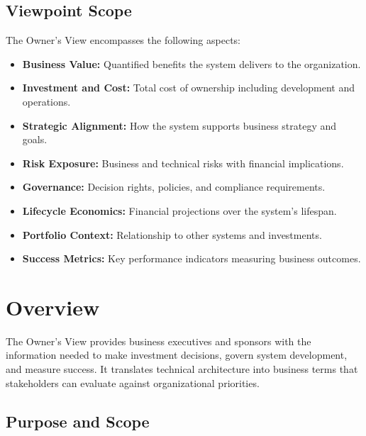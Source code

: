 \documentclass[11pt,letterpaper]{article}
\begin{document}
\subsection{Viewpoint Scope}

The Owner's View encompasses the following aspects:

\begin{itemize}
    \item \textbf{Business Value:} Quantified benefits the system delivers to the organization.
    
    \item \textbf{Investment and Cost:} Total cost of ownership including development and operations.
    
    \item \textbf{Strategic Alignment:} How the system supports business strategy and goals.
    
    \item \textbf{Risk Exposure:} Business and technical risks with financial implications.
    
    \item \textbf{Governance:} Decision rights, policies, and compliance requirements.
    
    \item \textbf{Lifecycle Economics:} Financial projections over the system's lifespan.
    
    \item \textbf{Portfolio Context:} Relationship to other systems and investments.
    
    \item \textbf{Success Metrics:} Key performance indicators measuring business outcomes.
\end{itemize}

\section{Overview}

The Owner's View provides business executives and sponsors with the information needed to make investment decisions, govern system development, and measure success. It translates technical architecture into business terms that stakeholders can evaluate against organizational priorities.

\subsection{Purpose and Scope}
\end{document}
